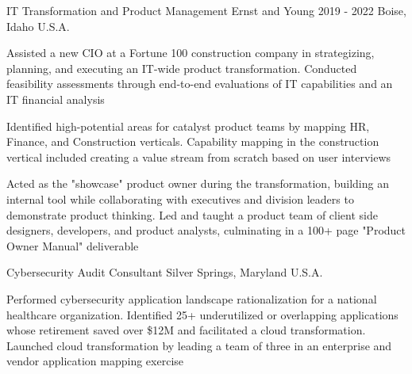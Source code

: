 \begin{cventries}
  \cventry
    {IT Transformation and Product Management} %
    {Ernst and Young} %
    {2019 - 2022} %
    {Boise, Idaho U.S.A.} %
    {
      \begin{cvitems} %
        \item {Assisted a new CIO at a Fortune 100 construction company in strategizing, planning, and executing an IT-wide product transformation. Conducted feasibility assessments through end-to-end evaluations of IT capabilities and an IT financial analysis}
        \item {Identified high-potential areas for catalyst product teams by mapping HR, Finance, and Construction verticals. Capability mapping in the construction vertical included creating a value stream from scratch based on user interviews}
        \item {Acted as the "showcase" product owner during the transformation, building an internal tool while collaborating with executives and division leaders to demonstrate product thinking. Led and taught a product team of client side designers, developers, and product analysts, culminating in a 100+ page "Product Owner Manual" deliverable}
      \end{cvitems}
    }

  \cventry
    {Cybersecurity Audit Consultant} %
    {} %
    {} %
    {Silver Springs, Maryland U.S.A.} %
    {
      \begin{cvitems} %
        \item {Performed cybersecurity application landscape rationalization for a national healthcare organization. Identified 25+ underutilized or overlapping applications whose retirement saved over \$12M and facilitated a cloud transformation. Launched cloud transformation by leading a team of three in an enterprise and vendor application mapping exercise}
      \end{cvitems}
    }


\end{cventries}
